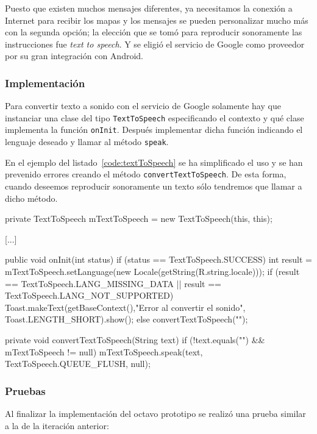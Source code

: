 Puesto que existen muchos mensajes diferentes, ya necesitamos la conexión a Internet para recibir
los mapas y los mensajes se pueden personalizar mucho más con la segunda opción; la elección que se
tomó para reproducir sonoramente las instrucciones fue \emph{text to speech}. Y se eligió el
servicio de Google como proveedor por su gran integración con Android.

\subsubsection{Implementación}

Para convertir texto a sonido con el servicio de Google solamente hay que instanciar una clase del
tipo \texttt{TextToSpeech} especificando el contexto y qué clase implementa la función
\texttt{onInit}. Después implementar dicha función indicando el lenguaje deseado y llamar al método
\texttt{speak}.

En el ejemplo del listado~\ref{code:textToSpeech} se ha simplificado el uso y se han prevenido
errores creando el método \texttt{convertTextToSpeech}. De esta forma, cuando deseemos reproducir
sonoramente un texto sólo tendremos que llamar a dicho método.

\begin{listing}[
  float=ht,
  language = java,
  caption  = {Ejemplo del uso de \texttt{TextToSpeech}},
  label    = code:textToSpeech]
private TextToSpeech mTextToSpeech = new TextToSpeech(this, this);

[...]

public void onInit(int status) {
  if (status == TextToSpeech.SUCCESS) {
    int result = mTextToSpeech.setLanguage(new Locale(getString(R.string.locale)));
    if (result == TextToSpeech.LANG_MISSING_DATA || result == TextToSpeech.LANG_NOT_SUPPORTED) {
      Toast.makeText(getBaseContext(),"Error al convertir el sonido", Toast.LENGTH_SHORT).show();
    } else {
      convertTextToSpeech("");
    }
  } 
}

private void convertTextToSpeech(String text) {
  if (!text.equals("") && mTextToSpeech != null) {
    mTextToSpeech.speak(text, TextToSpeech.QUEUE_FLUSH, null);
  }
}
\end{listing}
\subsubsection{Pruebas}

Al finalizar la implementación del octavo prototipo se realizó una prueba similar a la de la
iteración anterior:

